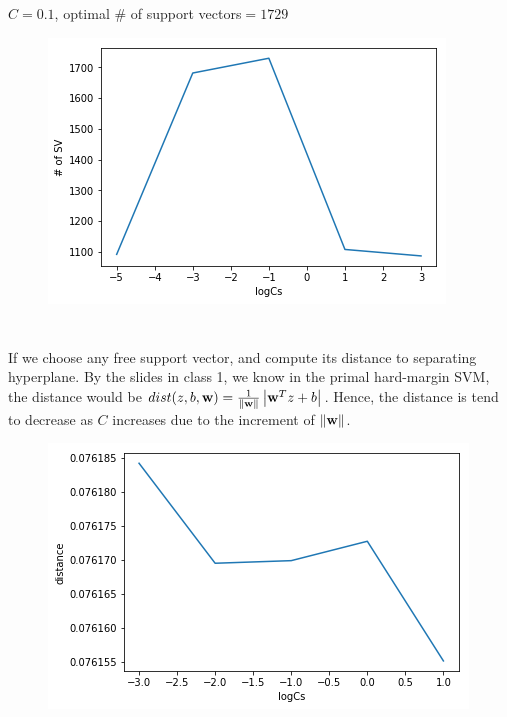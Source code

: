 \documentclass[fleqn,a4paper,12pt]{article}
\begin{document}
\section{} %
{\MaQ{}}$C=0.1${\MbQ{}}, {\MbQ{}}optimal \# of support vectors$=1729$
\begin{figure}[h]
\centering
\includegraphics[scale=0.9]{Q13.png}
\end{figure}

\section{} %
If we choose any free support vector, and compute its distance to separating hyperplane. By the slides in class 1, we know in the primal hard-margin SVM, the distance would be $dist( z, b, \bold w)=\frac{1}{\left \| \bold w \right \|} \left | \bold w^{T} z +b \right |$. Hence, the distance is tend to decrease as $C$ increases due to the increment of $\left \| \bold w \right \|$.
\begin{figure}[h]
\centering
\includegraphics[scale=0.78]{Q14.png}
\end{figure}
\end{document}

